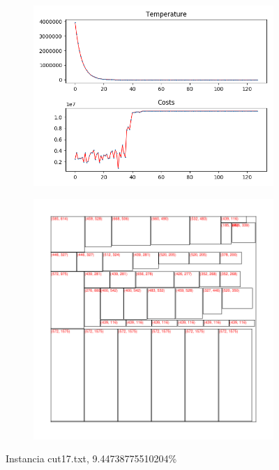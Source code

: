 \begin{figure}
\centering
\begin{subfigure}{.5\textwidth}
  \centering
  \includegraphics[width=1\linewidth]{results/cut17/2/plot}
  \label{fig:sub1}
\end{subfigure}%
\begin{subfigure}{.5\textwidth}
  \centering
  \includegraphics[width=1\linewidth]{results/cut17/2/cut}
  \label{fig:sub2}
\end{subfigure}
\caption{Instancia cut17.txt, 9.44738775510204\%}
\label{fig:test}
\end{figure}


